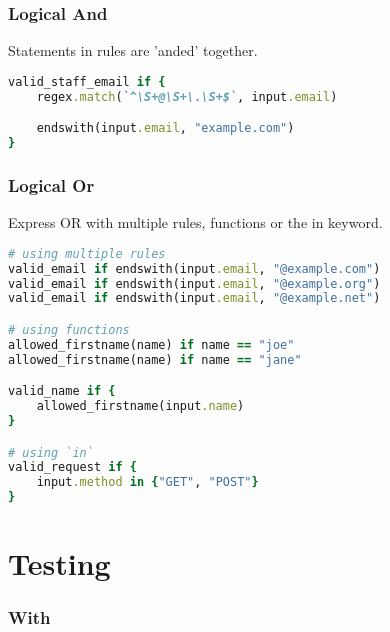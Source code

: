 \documentclass[twocolumn]{article}
\begin{document}
\vspace{-1em}
\subsubsection*{Logical And}


\footnotesize{Statements in rules are 'anded' together.}


\begin{lstlisting}[language=Ruby]
valid_staff_email if {
	regex.match(`^\S+@\S+\.\S+$`, input.email)

	endswith(input.email, "example.com")
}
\end{lstlisting}





\vspace{-1em}
\subsubsection*{Logical Or}


\footnotesize{Express OR with multiple rules, functions or the in keyword.}


\begin{lstlisting}[language=Ruby]
# using multiple rules
valid_email if endswith(input.email, "@example.com")
valid_email if endswith(input.email, "@example.org")
valid_email if endswith(input.email, "@example.net")

# using functions
allowed_firstname(name) if name == "joe"
allowed_firstname(name) if name == "jane"

valid_name if {
	allowed_firstname(input.name)
}

# using `in`
valid_request if {
	input.method in {"GET", "POST"}
}
\end{lstlisting}









\section*{Testing  }




\vspace{-1em}
\subsubsection*{With}
\end{document}
